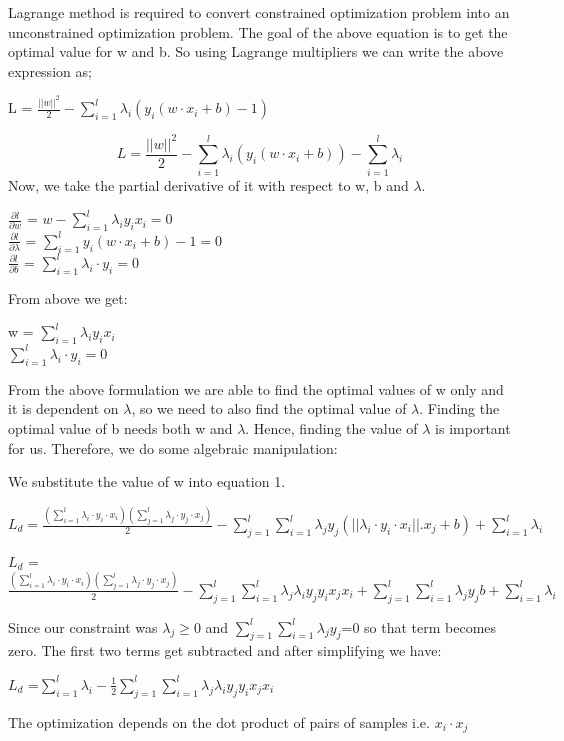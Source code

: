 \documentclass{article}
\begin{document}
	Lagrange method is required to convert constrained optimization problem into an unconstrained optimization problem. The goal of the above equation is to get the optimal value for w and b. So using Lagrange multipliers we can write the above expression as;
	\begin{center}
	    L = $\frac{||w||^2}{2} - \sum_{i=1}^{l} \lambda_i(y_i(w\cdot x_i+b)-1)$\\
	\end{center}
	\begin{equation}
	            L = \frac{||w||^2}{2} - \sum_{i=1}^{l} \lambda_i(y_i(w\cdot x_i+b))-\sum_{i=1}^{l}\lambda_i
	\end{equation}
	Now, we take the partial derivative of it with respect to w, b and $\lambda$.
	\begin{center}
	        $\frac{\partial l}{\partial w}$ = $w - \sum_{i=1}^{l} \lambda_i y_i x_i=0$\\
	        $\frac{\partial l}{\partial \lambda}$ = $ \sum_{i=1}^{l} y_i (w \cdot x_i+b)-1=0$\\
	        $\frac{\partial l}{\partial b}$ = $ \sum_{i=1}^{l} \lambda_i \cdot y_i=0$
	\end{center}
	From above we get:
	\begin{center}
	        w = $\sum_{i=1}^{l} \lambda_i y_i x_i$\\
	        $ \sum_{i=1}^{l} \lambda_i \cdot y_i=0$
	\end{center}

	From the above formulation we are able to find the optimal values of w only and it is dependent on $\lambda$, so we need to  also find the optimal value of $\lambda$. Finding the optimal value of b needs both w and $\lambda$. Hence, finding the value of $\lambda$ is important for us. Therefore, we do some algebraic manipulation:


	We substitute the value of w into equation 1. 

	\begin{center}
	$L_d = \frac{ (\sum_{i=1}^l\lambda_i \cdot y_i \cdot x_i)(\sum_{j=1}^l\lambda_j \cdot y_j \cdot x_j)}{2}-\sum_{j=1}^l\sum_{i=1}^l\lambda_j y_j(||\lambda_i \cdot y_i \cdot x_i||.x_j+b)+\sum_{i=1}^l \lambda_i$
	\end{center}
	\begin{center}
	    $L_d$ =$ \frac{(\sum_{i=1}^l\lambda_i \cdot y_i \cdot x_i)(\sum_{j=1}^l\lambda_j \cdot y_j \cdot x_j)}{2}-\sum_{j=1}^l\sum_{i=1}^l\lambda_j\lambda_i y_j y_i x_j x_i+\sum_{j=1}^l\sum_{i=1}^l\lambda_j y_j b+\sum_{i=1}^l \lambda_i$
	\end{center}
	Since our constraint was $\lambda_j \geq 0$ and $\sum_{j=1}^l\sum_{i=1}^l\lambda_j y_j$=0 so that term becomes zero. The first two terms get subtracted and after simplifying we have:
	\begin{center}
	    $L_d$ =$ \sum_{i=1}^l \lambda_i-\frac{1}{2}\sum_{j=1}^l\sum_{i=1}^l\lambda_j\lambda_i y_j y_i x_j x_i$
	\end{center}
	The optimization depends on the dot product of pairs of samples i.e. $x_i \cdot x_j$
\end{document}
